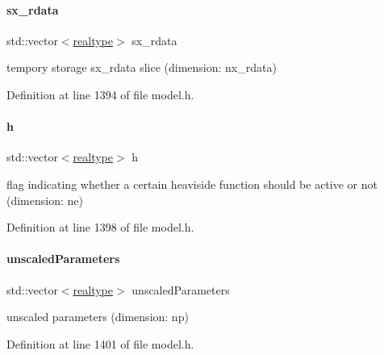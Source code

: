 \paragraph{\texorpdfstring{sx\_rdata}{sx\_rdata}}
{\footnotesize\ttfamily std\+::vector$<$\mbox{\hyperlink{namespaceamici_a1bdce28051d6a53868f7ccbf5f2c14a3}{realtype}}$>$ sx\+\_\+rdata\hspace{0.3cm}{\ttfamily [protected]}}

tempory storage sx\+\_\+rdata slice (dimension\+: nx\+\_\+rdata) 

Definition at line 1394 of file model.\+h.

\mbox{\label{classamici_1_1_model_a0e4df9c10406b35bd54f6f839322ca87}} 
\paragraph{\texorpdfstring{h}{h}}
{\footnotesize\ttfamily std\+::vector$<$\mbox{\hyperlink{namespaceamici_a1bdce28051d6a53868f7ccbf5f2c14a3}{realtype}}$>$ h\hspace{0.3cm}{\ttfamily [protected]}}

flag indicating whether a certain heaviside function should be active or not (dimension\+: ne) 

Definition at line 1398 of file model.\+h.

\mbox{\label{classamici_1_1_model_a2f57f75ff99d8bfcabb33c8cda86308d}} 
\paragraph{\texorpdfstring{unscaledParameters}{unscaledParameters}}
{\footnotesize\ttfamily std\+::vector$<$\mbox{\hyperlink{namespaceamici_a1bdce28051d6a53868f7ccbf5f2c14a3}{realtype}}$>$ unscaled\+Parameters\hspace{0.3cm}{\ttfamily [protected]}}

unscaled parameters (dimension\+: np) 

Definition at line 1401 of file model.\+h.

\mbox{\label{classamici_1_1_model_a65d6047f145381b0363ac02feb2433b4}} 
